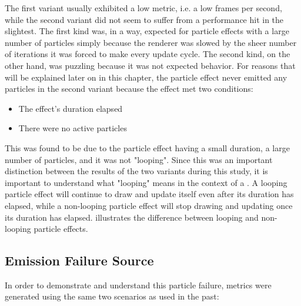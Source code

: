 The first variant usually exhibited a low  metric, i.e. a low frames per second, while the second variant did not seem to suffer from a performance hit in the slightest. The first kind was, in a way, expected for particle effects with a large number of particles simply because the renderer was slowed by the sheer number of iterations it was forced to make every update cycle. The second kind, on the other hand, was puzzling because it was not expected behavior. For reasons that will be explained later on in this chapter, the particle effect never emitted any particles in the second variant because the effect met two conditions:

\begin{itemize}[nolistsep,topsep=0pt]
	\item The effect's duration elapsed
	\item There were no active particles
\end{itemize}

This was found to be due to the particle effect having a small duration, a large number of particles, and it was not "looping". Since this was an important distinction between the results of the two variants during this study, it is important to understand what "looping" means in the context of a . A looping particle effect will continue to draw and update itself even after its duration has elapsed, while a non-looping particle effect will stop drawing and updating once its duration has elapsed.  illustrates the difference between looping and non-looping particle effects.

\subsection{Emission Failure Source}\label{ssec:observe_emit_failure_source}

In order to demonstrate and understand this particle failure, metrics were generated using the same two scenarios as used in the past:


